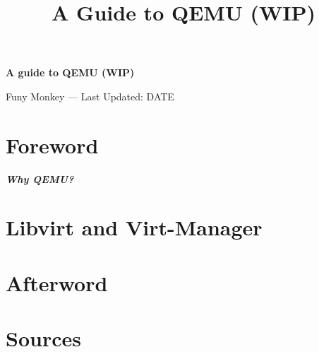 \documentclass{article}
\title{A Guide to QEMU (WIP)}
\renewcommand{\maketitle}{
	\begin{center}
		{\huge\bfseries
		A guide to QEMU (WIP)}
		\vspace{.25em}

		Funy Monkey --- Last Updated: DATE 
	\end{center}
}
\begin{document}
\maketitle
\tableofcontents

\section{Foreword}
	\textbf{\textit{Why QEMU?}}

\section{Libvirt and Virt-Manager}
\section{Afterword}
\section{Sources}
\end{document}
